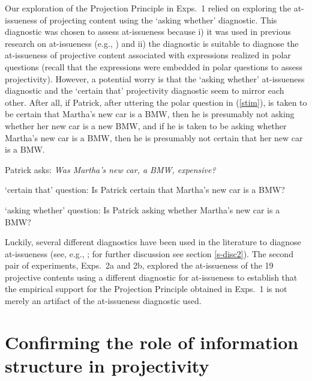 \documentclass[11pt,fleqn]{article}
\newcommand{\6}{\mbox{$[\hspace*{-.6mm}[$}}
\newcommand{\9}{\mbox{$]\hspace*{-.6mm}]$}}
\begin{document}
Our exploration of the Projection Principle in Exps.~1 relied on exploring the at-issueness of projecting content using the `asking whether' diagnostic. This diagnostic was chosen to assess at-issueness because i) it was used in previous research on at-issueness (e.g., \citealt{amaral-etal07,tonhauser-sula6}) and ii) the diagnostic is suitable to diagnose the at-issueness of projective content associated with expressions realized in polar questions (recall that the expressions were embedded in polar questions to assess projectivity). However, a potential worry is that the `asking whether' at-issueness diagnostic and the `certain that' projectivity diagnostic seem to mirror each other. After all, if Patrick, after uttering the polar question in (\ref{stim}), is taken to be certain that Martha's new car is a BMW, then he is presumably not asking whether her new car is a new BMW, and if he is taken to be asking whether Martha's new car is a BMW, then he is presumably not certain that her new car is a BMW.

\begin{exe}

\exi{(\ref{stim})} Patrick asks: {\em Was Martha's new car, a BMW, expensive?} 

\begin{xlist}
\ex `certain that' question: Is Patrick certain that Martha's new car is a BMW?

\ex `asking whether' question: Is Patrick asking whether Martha's new car is a BMW?

\end{xlist}

\end{exe}
Luckily, several different diagnostics have been used in the literature to diagnose at-issueness (see, e.g., \citealt{tonhauser-sula6}; for further discussion see section \ref{s-disc2}). The second pair of experiments, Exps.~2a and 2b, explored the at-issueness of the 19 projective contents using a different diagnostic for at-issueness to establish that the empirical support for the Projection Principle obtained in Exps.~1 is not merely an artifact of the at-issueness diagnostic used.

\section{Confirming the role of information structure in projectivity}\label{s4}
\end{document}
